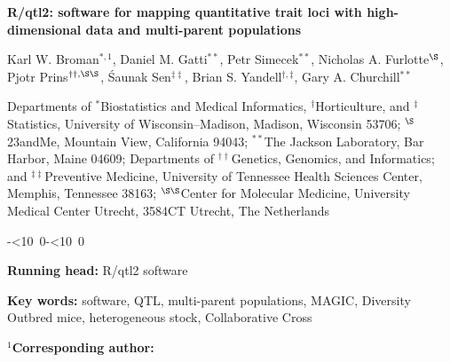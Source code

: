 \documentclass[12pt,letterpaper]{article}
\begin{document}

\vspace*{8mm}
\begin{center}

\textbf{\Large R/qtl2: software for mapping quantitative trait loci
  with high-dimensional data and multi-parent populations}

\bigskip \bigskip \bigskip \bigskip

{\large Karl W. Broman$^{*,1}$, Daniel M. Gatti$^{**}$, Petr Simecek$^{**}$,
  Nicholas A. Furlotte$^{\S}$, \\
  Pjotr Prins$^{\dagger\dagger,\S\S}$, \'Saunak
  Sen$^{\ddagger\ddagger}$, Brian S. Yandell$^{\dagger,\ddagger}$,
  Gary A. Churchill$^{**}$}

\bigskip \bigskip

Departments of $^{*}$Biostatistics and Medical Informatics,
$^{\dagger}$Horticulture, and $^{\ddagger}$Statistics, University of
Wisconsin--Madison, Madison, Wisconsin 53706; $^{\S}$23andMe, Mountain
View, California 94043; $^{**}$The Jackson Laboratory, Bar Harbor, Maine 04609;
Departments of $^{\dagger\dagger}$Genetics, Genomics, and Informatics; and
$^{\ddagger\ddagger}$Preventive Medicine, University of
Tennessee Health Sciences Center, Memphis, Tennessee 38163;
$^{\S\S}$Center for Molecular Medicine, University Medical Center Utrecht, 3584CT Utrecht, The
Netherlands

\end{center}

\def\todayISO{\leavevmode\hbox{\the\year-\twodigits\month-\twodigits\day}}
\def\twodigits#1{\ifnum#1<10 0\fi\the#1}

\vspace{3in} \hfill {\footnotesize \todayISO}

\newpage

\noindent \textbf{Running head:} R/qtl2 software


\bigskip \bigskip \bigskip

\noindent \textbf{Key words:} software, QTL,
multi-parent populations, MAGIC, Diversity Outbred mice, heterogeneous stock,
Collaborative Cross




\bigskip \bigskip \bigskip

\noindent \textbf{$^1$Corresponding author:}
\end{document}
